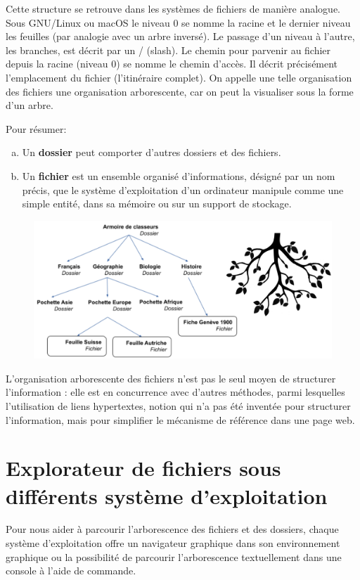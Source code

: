 \documentclass[11pt, a4paper]{book}
\begin{document}
Cette structure se retrouve dans les systèmes de fichiers de manière analogue. Sous GNU/Linux ou macOS le niveau 0 se nomme la racine et le dernier niveau les feuilles (par analogie avec un arbre inversé). Le passage d’un niveau à l’autre, les branches, est décrit par un / (slash). Le chemin pour parvenir au fichier depuis la racine (niveau 0) se nomme le chemin d’accès. Il décrit précisément l’emplacement du fichier (l’itinéraire complet). On appelle une telle organisation des fichiers une organisation arborescente, car on peut la visualiser sous la forme d’un arbre.

Pour résumer: 
\begin{enumerate}[a)]
\item Un {\bf dossier} peut comporter d’autres dossiers et des fichiers.
\item Un {\bf fichier} est un ensemble organisé d'informations, désigné par un nom précis, que le système d'exploitation d'un ordinateur manipule comme une simple entité, dans sa mémoire ou sur un support de stockage.
\end{enumerate}

\begin{figure}[h!]
\centering
\includegraphics[width=15cm]{images/arborescence2}
\end{figure}
L’organisation arborescente des fichiers n’est pas le seul moyen de structurer l’information : elle est en concurrence avec d’autres méthodes, parmi lesquelles l’utilisation de liens hypertextes, notion qui n’a pas été inventée pour structurer l’information, mais pour simplifier le mécanisme de référence dans une page web.

\section{Explorateur de fichiers sous différents système d'exploitation}
Pour nous aider à parcourir l’arborescence des fichiers et des dossiers, chaque système d’exploitation offre un navigateur graphique dans son environnement graphique ou la possibilité de parcourir l'arborescence textuellement dans une console à l'aide de commande.
\end{document}
